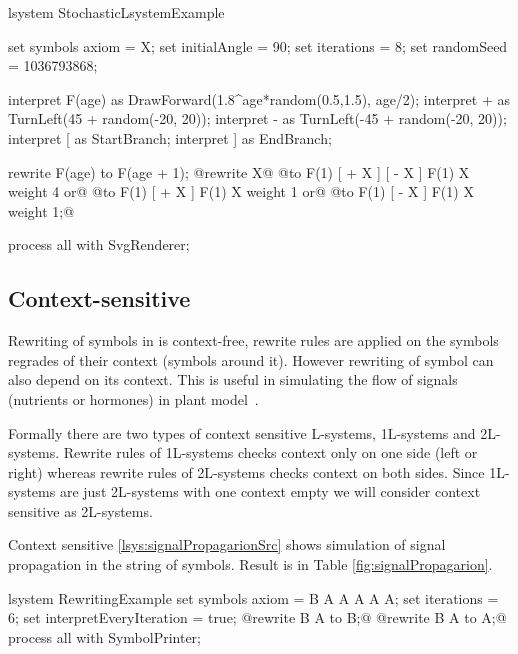 \begin{Lsystem}[label=lsys:randExample,caption={Example of stochastic \lsystem with randomized rewrite rules and interpretation}]
lsystem StochasticLsystemExample {
	set symbols axiom = X;
	set initialAngle = 90;
	set iterations = 8;
	set randomSeed = 1036793868;

	interpret F(age) as DrawForward(1.8^age*random(0.5,1.5), age/2);
	interpret + as TurnLeft(45 + random(-20, 20));
	interpret - as TurnLeft(-45 + random(-20, 20));
	interpret [ as StartBranch;
	interpret ] as EndBranch;

	rewrite F(age) to F(age + 1);
	@rewrite X@
		@to F(1) [ + X ] [ - X ] F(1) X  weight 4 or@
		@to F(1) [ + X ]         F(1) X  weight 1 or@
		@to F(1)         [ - X ] F(1) X  weight 1;@
}
process all with SvgRenderer;
\end{Lsystem}


\subsection{Context-sensitive \lsystems}

\newcommand{\onelsystems}{\mbox{1L-systems}\xspace}
\newcommand{\twolsystems}{\mbox{2L-systems}\xspace}

Rewriting of symbols in \zerolsystems is context-free, rewrite rules are applied on the symbols regrades of their context (symbols around it).
However rewriting of symbol can also depend on its context.
This is useful in simulating the flow of signals (nutrients or hormones) in plant model~\citep{PL91}.

Formally there are two types of context sensitive L-systems, \onelsystems and \twolsystems.
Rewrite rules of \onelsystems checks context only on one side (left or right) whereas rewrite rules of \twolsystems checks context on both sides.
Since \onelsystems are just \twolsystems with one context empty we will consider context sensitive \lsystems as \twolsystems.

Context sensitive \lsystem \ref{lsys:signalPropagarionSrc} shows simulation of signal propagation in the string of symbols.
Result is in Table \ref{fig:signalPropagarion}.

\begin{Lsystem}[label=lsys:signalPropagarionSrc,caption={Context-sensitive \lsystems simulating signal propagation}]
lsystem RewritingExample {
	set symbols axiom = B A A A A A;
	set iterations = 6;
	set interpretEveryIteration = true;
	@rewrite {B} A     to B;@
	@rewrite     B {A} to A;@
}
process all with SymbolPrinter;
\end{Lsystem}

